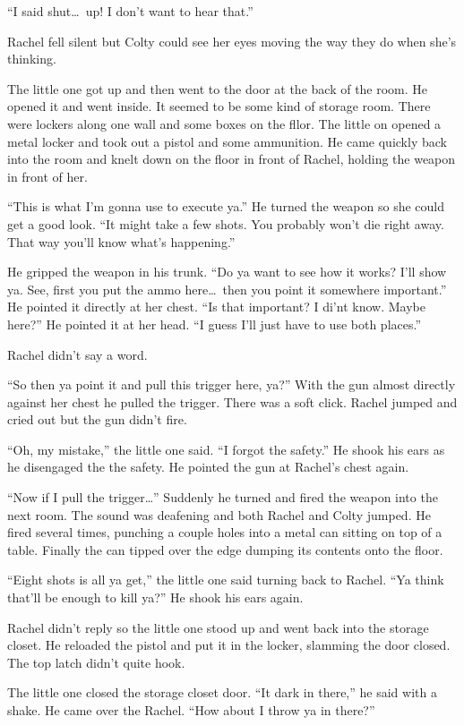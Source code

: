 ``I said shut\ldots\ up! I don't want to hear that.''

Rachel fell silent but Colty could see her eyes moving the way they do when she's thinking.

The little one got up and then went to the door at the back of the room. He opened it and went
inside. It seemed to be some kind of storage room. There were lockers along one wall and some
boxes on the fllor. The little on opened a metal locker and took out a pistol and some
ammunition. He came quickly back into the room and knelt down on the floor in front of Rachel,
holding the weapon in front of her.

``This is what I'm gonna use to execute ya.'' He turned the weapon so she could get a good look.
``It might take a few shots. You probably won't die right away. That way you'll know what's
happening.''

He gripped the weapon in his trunk. ``Do ya want to see how it works? I'll show ya. See, first
you put the ammo here\ldots\ then you point it somewhere important.'' He pointed it directly at
her chest. ``Is that important? I di'nt know. Maybe here?'' He pointed it at her head. ``I guess
I'll just have to use both places.''

Rachel didn't say a word.

``So then ya point it and pull this trigger here, ya?'' With the gun almost directly against her
chest he pulled the trigger. There was a soft click. Rachel jumped and cried out but the gun
didn't fire.

``Oh, my mistake,'' the little one said. ``I forgot the safety.'' He shook his ears as he
disengaged the the safety. He pointed the gun at Rachel's chest again.

``Now if I pull the trigger\ldots'' Suddenly he turned and fired the weapon into the next room.
The sound was deafening and both Rachel and Colty jumped. He fired several times, punching a
couple holes into a metal can sitting on top of a table. Finally the can tipped over the edge
dumping its contents onto the floor.

``Eight shots is all ya get,'' the little one said turning back to Rachel. ``Ya think that'll be
enough to kill ya?'' He shook his ears again.

Rachel didn't reply so the little one stood up and went back into the storage closet. He
reloaded the pistol and put it in the locker, slamming the door closed. The top latch didn't
quite hook.

The little one closed the storage closet door. ``It dark in there,'' he said with a shake. He
came over the Rachel. ``How about I throw ya in there?''

